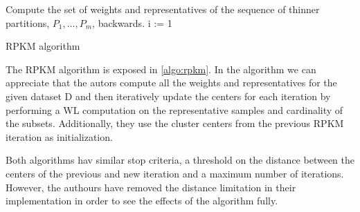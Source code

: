 \begin{algorithm}[H]
    \SetAlgoLined
    Compute the set of weights and representatives of the sequence of thinner partitions, $P_1, \dots ,P_m$, backwards. \;
    i := 1\;
    \label{algo:rpkm}
    \caption{RPKM algorithm}
\end{algorithm}

The RPKM algorithm is exposed in \ref{algo:rpkm}. In the algorithm we can appreciate that the autors compute all the weights and representatives for the given dataset D and then iteratively update the centers for each iteration by performing a WL computation on the representative samples and cardinality of the subsets. Additionally, they use the cluster centers from the previous RPKM iteration as initialization.

Both algorithms hav similar stop criteria, a threshold on the distance between the centers of the previous and new iteration and a maximum number of iterations. However, the authours have removed the distance limitation in their implementation in order to see the effects of the algorithm fully.